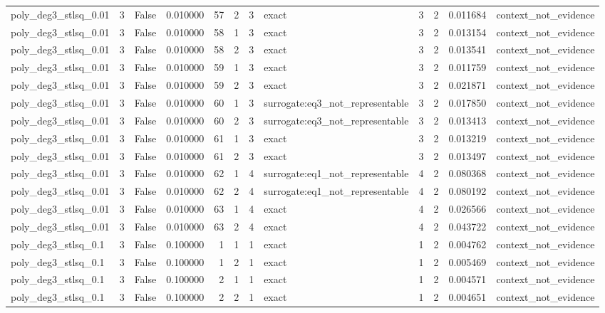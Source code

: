 \begin{tabular}{lrrrrrrlrrrl}
poly\_deg3\_stlsq\_0.01 & 3 & False & 0.010000 & 57 & 2 & 3 & exact & 3 & 2 & 0.011684 & context\_not\_evidence \\
poly\_deg3\_stlsq\_0.01 & 3 & False & 0.010000 & 58 & 1 & 3 & exact & 3 & 2 & 0.013154 & context\_not\_evidence \\
poly\_deg3\_stlsq\_0.01 & 3 & False & 0.010000 & 58 & 2 & 3 & exact & 3 & 2 & 0.013541 & context\_not\_evidence \\
poly\_deg3\_stlsq\_0.01 & 3 & False & 0.010000 & 59 & 1 & 3 & exact & 3 & 2 & 0.011759 & context\_not\_evidence \\
poly\_deg3\_stlsq\_0.01 & 3 & False & 0.010000 & 59 & 2 & 3 & exact & 3 & 2 & 0.021871 & context\_not\_evidence \\
poly\_deg3\_stlsq\_0.01 & 3 & False & 0.010000 & 60 & 1 & 3 & surrogate:eq3\_not\_representable & 3 & 2 & 0.017850 & context\_not\_evidence \\
poly\_deg3\_stlsq\_0.01 & 3 & False & 0.010000 & 60 & 2 & 3 & surrogate:eq3\_not\_representable & 3 & 2 & 0.013413 & context\_not\_evidence \\
poly\_deg3\_stlsq\_0.01 & 3 & False & 0.010000 & 61 & 1 & 3 & exact & 3 & 2 & 0.013219 & context\_not\_evidence \\
poly\_deg3\_stlsq\_0.01 & 3 & False & 0.010000 & 61 & 2 & 3 & exact & 3 & 2 & 0.013497 & context\_not\_evidence \\
poly\_deg3\_stlsq\_0.01 & 3 & False & 0.010000 & 62 & 1 & 4 & surrogate:eq1\_not\_representable & 4 & 2 & 0.080368 & context\_not\_evidence \\
poly\_deg3\_stlsq\_0.01 & 3 & False & 0.010000 & 62 & 2 & 4 & surrogate:eq1\_not\_representable & 4 & 2 & 0.080192 & context\_not\_evidence \\
poly\_deg3\_stlsq\_0.01 & 3 & False & 0.010000 & 63 & 1 & 4 & exact & 4 & 2 & 0.026566 & context\_not\_evidence \\
poly\_deg3\_stlsq\_0.01 & 3 & False & 0.010000 & 63 & 2 & 4 & exact & 4 & 2 & 0.043722 & context\_not\_evidence \\
poly\_deg3\_stlsq\_0.1 & 3 & False & 0.100000 & 1 & 1 & 1 & exact & 1 & 2 & 0.004762 & context\_not\_evidence \\
poly\_deg3\_stlsq\_0.1 & 3 & False & 0.100000 & 1 & 2 & 1 & exact & 1 & 2 & 0.005469 & context\_not\_evidence \\
poly\_deg3\_stlsq\_0.1 & 3 & False & 0.100000 & 2 & 1 & 1 & exact & 1 & 2 & 0.004571 & context\_not\_evidence \\
poly\_deg3\_stlsq\_0.1 & 3 & False & 0.100000 & 2 & 2 & 1 & exact & 1 & 2 & 0.004651 & context\_not\_evidence \\

\end{tabular}
